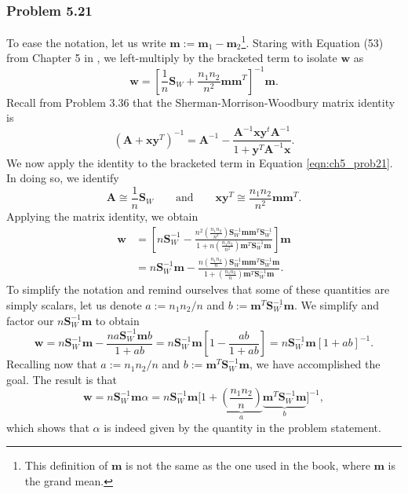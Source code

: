 \documentclass[12pt, a4paper]{article}
\newcommand{\vect}[1]{\bm{#1}}
\begin{document}
\subsubsection*{Problem 5.21}
To ease the notation, let us write $\vect{m} := \vect{m}_1 - \vect{m}_2$\footnote{This definition of $\vect{m}$ is not the same as the one used in the book, where $\vect{m}$ is the grand mean.}.
Staring with Equation (53) from Chapter 5 in \cite{duda_pattern_2000}, we left-multiply by the bracketed term to isolate $\vect{w}$ as 
\begin{equation}
\label{eqn:ch5_prob21}
	\vect{w} = \left[ \frac{1}{n} \vect{S}_W + \frac{n_1 n_2}{n^2} \vect{m} \vect{m}^T \right]^{-1} \vect{m}.
\end{equation}
Recall from Problem 3.36 that the Sherman-Morrison-Woodbury matrix identity is 
\begin{equation*}
	\left(\vect{A} + \vect{x}\vect{y}^T\right)^{-1} =
	\vect{A}^{-1} - \frac{\vect{A}^{-1} \vect{x} \vect{y}^t \vect{A}^{-1}}{1 + \vect{y}^T \vect{A}^{-1} \vect{x}}.
\end{equation*}
We now apply the identity to the bracketed term in Equation \eqref{eqn:ch5_prob21}.
In doing so, we identify 
\begin{equation*}
	\vect{A} \cong \frac{1}{n} \vect{S}_W 
	\quad \quad \text{and} \quad \quad
	\vect{x}\vect{y}^T \cong \frac{n_1 n_2}{n^2} \vect{m} \vect{m}^T.
\end{equation*}
Applying the matrix identity, we obtain
\begin{align*}
	\vect{w} &= \left[ n \vect{S}_W^{-1} - \frac{
		n^2 \left( \frac{n_1 n_2}{n^2} \right)
		\vect{S}_W^{-1} \vect{m} \vect{m}^T \vect{S}_W^{-1}
		}{
		1 + n \left( \frac{n_1 n_2}{n^2} \right) \vect{m}^T \vect{S}_W^{-1} \vect{m} 
		}  \right] \vect{m} \\
		&=
		n \vect{S}_W^{-1}\vect{m} - \frac{
			n \left( \frac{n_1 n_2}{n} \right)
			\vect{S}_W^{-1} \vect{m} \vect{m}^T \vect{S}_W^{-1}\vect{m}
		}{
		1 +  \left( \frac{n_1 n_2}{n} \right) \vect{m}^T \vect{S}_W^{-1} \vect{m} 
	}.
\end{align*}
To simplify the notation and remind ourselves that some of these quantities are simply scalars, let us denote $a:= n_1 n_2 / n$ and $b := \vect{m}^T \vect{S}_W^{-1} \vect{m} $.
We simplify and factor our $n \vect{S}_W^{-1} \vect{m}$ to obtain
\begin{equation*}
	\vect{w} = n \vect{S}_W^{-1}\vect{m} - \frac{
		n a
		\vect{S}_W^{-1} \vect{m} b
	}{
	1 +  a b }
	=
	n \vect{S}_W^{-1} \vect{m} \left[ 1  - \frac{ab}{1 + ab} \right]
	=
	n \vect{S}_W^{-1} \vect{m} \left[ 1  + ab \right]^{-1}.
\end{equation*}
Recalling now that $a:= n_1 n_2 / n$ and $b := \vect{m}^T \vect{S}_W^{-1} \vect{m} $, we have accomplished the goal.
The result is that
\begin{equation*}
	\vect{w} = n \vect{S}_W^{-1} \vect{m} \alpha = n \vect{S}_W^{-1} \vect{m} \big[ 1 + \underbrace{\left( \frac{n_1 n_2}{n} \right)}_a \underbrace{\vect{m}^T \vect{S}_W^{-1} \vect{m}}_b \big]^{-1},
\end{equation*}
which shows that $\alpha$ is indeed given by the quantity in the problem statement.
\end{document}
